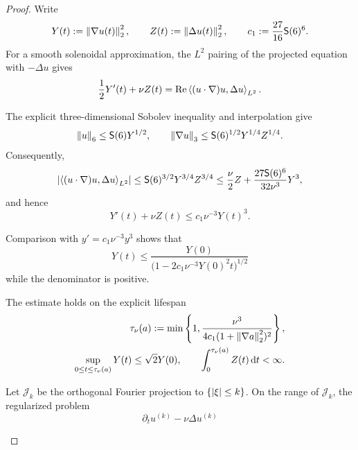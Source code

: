 \begin{proof}
Write
\[
 Y(t):=\left\lVert \nabla u(t)\right\rVert_2^2,
 \qquad
 Z(t):=\left\lVert \Delta u(t)\right\rVert_2^2,
 \qquad
 c_1:=\frac{27}{16}\mathsf S(6)^6.
\]
For a smooth solenoidal approximation, the \(L^2\) pairing of the projected
equation with \(-\Delta u\) gives
\begin{equation}
 \frac12Y'(t)+\nu Z(t)
 =\operatorname{Re}\left\langle (u\cdot\nabla)u,\Delta u\right\rangle_{L^2}.
 \label{u:eq:qc-H1-energy-pairing}
\end{equation}
\begin{samepage}
The explicit three-dimensional Sobolev inequality and interpolation give
\[
 \left\lVert u\right\rVert_6\le\mathsf S(6)Y^{1/2},
 \qquad
 \left\lVert \nabla u\right\rVert_3
 \le\mathsf S(6)^{1/2}Y^{1/4}Z^{1/4}.
\]
Consequently,
\[
 \left|\left\langle (u\cdot\nabla)u,\Delta u\right\rangle_{L^2}\right|
 \le \mathsf S(6)^{3/2}Y^{3/4}Z^{3/4}
 \le\frac\nu2Z+\frac{27\mathsf S(6)^6}{32\nu^3}Y^3,
\]
and hence
\begin{equation}
 Y'(t)+\nu Z(t)\le c_1\nu^{-3}Y(t)^3.
 \label{u:eq:qc-H1-ode}
\end{equation}
\par
\end{samepage}
\begin{samepage}
Comparison with \(y'=c_1\nu^{-3}y^3\) shows that
\begin{equation}
 Y(t)\le
 \frac{Y(0)}{\bigl(1-2c_1\nu^{-3}Y(0)^2t\bigr)^{1/2}}
 \label{u:eq:qc-H1-local-explicit}
\end{equation}
while the denominator is positive.
\par
\end{samepage}
\begin{samepage}
The estimate holds on the explicit lifespan
\begin{equation}
 \begin{aligned}
 \tau_\nu(a):=
 \min\left\{1,
 \frac{\nu^3}{4c_1(1+\left\lVert \nabla a\right\rVert_2^2)^2}
 \right\},\\
 \sup_{0\le t\le\tau_\nu(a)}Y(t)\le\sqrt2Y(0),
 \qquad
 \int_0^{\tau_\nu(a)}Z(t)\,\mathrm d t<\infty.
 \end{aligned}
 \label{u:eq:qc-H1-local-lifespan}
\end{equation}
\par
\end{samepage}
\begin{samepage}
Let \(\mathcal J_k\) be the orthogonal Fourier projection to
\(\{\left|\xi\right|\le k\}\).  On the range of \(\mathcal J_k\), the regularized
problem
\begin{equation}
 \partial_tu^{(k)}-\nu\Delta u^{(k)}

\end{equation}
\end{samepage}
\end{proof}
